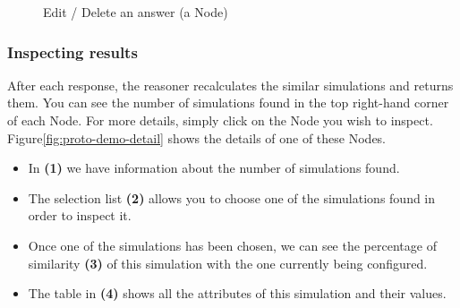     \begin{figure}[h]
    \centering
    \caption{\label{fig:proto-demo-edit-delete-answer}  Edit / Delete an answer (a Node)}
    \end{figure}

    
    \subsubsection{Inspecting results}
    After each response, the reasoner recalculates the similar simulations and returns them. You can see the number of simulations found in the top right-hand corner of each Node. For more details, simply click on the Node you wish to inspect. Figure\ref{fig:proto-demo-detail} shows the details of one of these Nodes.
    
    \begin{itemize}
        \item In \textbf{(1)} we have information about the number of simulations found.
        \item The selection list \textbf{(2)} allows you to choose one of the simulations found in order to inspect it.
        \item Once one of the simulations has been chosen, we can see the percentage of similarity \textbf{(3)} of this simulation with the one currently being configured.
        \item The table in \textbf{(4)} shows all the attributes of this simulation and their values.
    \end{itemize}
    
